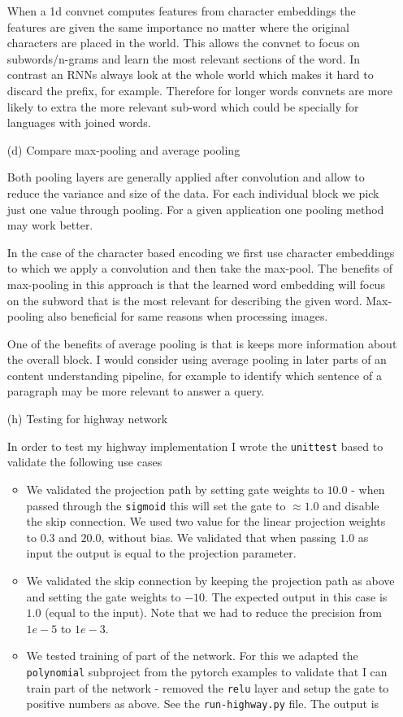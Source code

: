 \documentclass{article}
\begin{document}
\begin{enumerate}
When a 1d convnet computes features from character embeddings the features are given the same importance no matter where the original characters are placed in the world. This allows the convnet to focus on subwords/n-grams and learn the most relevant sections of the word. In contrast an RNNs always look at the whole world which makes it hard to discard the prefix, for example. Therefore for longer words convnets are more likely to extra the more relevant sub-word which could be specially for languages with joined words.

\item[(d)]{Compare max-pooling and average pooling}

Both pooling layers are generally applied after convolution and allow to reduce the variance and size of the data. For each individual block we pick just one value through pooling. For a given application one pooling method may work better.

In the case of the character based encoding we first use character embeddings to which we apply a convolution and then take the max-pool. The benefits of max-pooling in this approach is that the learned word embedding will focus on the subword that is the most relevant for describing the given word. Max-pooling also beneficial for same reasons when processing images.

One of the benefits of average pooling is that is keeps more information about the overall block. I would consider using average pooling in later parts of an content understanding pipeline, for example to identify which sentence of a paragraph may be more relevant to answer a query.



\clearpage
\item[(h)]{Testing for highway network}

In order to test my highway implementation I wrote the \texttt{unittest} based  to validate the following use cases

\begin{itemize}
\item We validated the projection path by setting gate weights to $10.0$ - when passed through the \texttt{sigmoid} this will set the gate to $\approx 1.0$ and disable the skip connection. We used two value for the linear projection weights to $0.3$ and $20.0$, without bias. We validated that when passing $1.0$ as input the output is equal to the projection parameter.
\item We validated the skip connection by keeping the projection path as above and setting the gate weights to $-10$. The expected output in this case is $1.0$ (equal to the input). Note that we had to reduce the precision from $1e-5$ to $1e-3$.
\item We tested training of part of the network. For this we adapted the \texttt{polynomial} subproject from the pytorch examples to validate that I can train part of the network - removed the \texttt{relu} layer and setup the gate to positive numbers as above. See the \texttt{run-highway.py} file. The output is


\end{itemize}
\end{enumerate}
\end{document}
